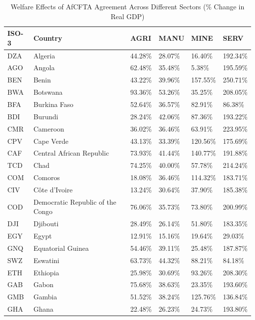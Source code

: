 \begin{table}[htbp]
\centering
\caption{Welfare Effects of AfCFTA Agreement Across Different Sectors (\% Change in Real GDP)} 
\label{table_3}
\begingroup\small
\begin{tabular}{llllll}
  \hline
ISO-3 & Country & AGRI & MANU & MINE & SERV \\ 
  \hline
DZA & Algeria & 44.28\% & 28.07\% & 16.40\% & 192.34\% \\ 
  AGO & Angola & 62.48\% & 35.48\% & 5.38\% & 195.59\% \\ 
  BEN & Benin & 43.22\% & 39.96\% & 157.55\% & 250.71\% \\ 
  BWA & Botswana & 93.36\% & 53.26\% & 35.25\% & 208.05\% \\ 
  BFA & Burkina Faso & 52.64\% & 36.57\% & 82.91\% & 86.38\% \\ 
  BDI & Burundi & 28.24\% & 42.06\% & 87.36\% & 193.22\% \\ 
  CMR & Cameroon & 36.02\% & 36.46\% & 63.91\% & 223.95\% \\ 
  CPV & Cape Verde & 43.13\% & 33.39\% & 120.56\% & 175.69\% \\ 
  CAF & Central African Republic & 73.93\% & 41.44\% & 140.77\% & 191.88\% \\ 
  TCD & Chad & 74.25\% & 40.00\% & 57.78\% & 214.24\% \\ 
  COM & Comoros & 18.08\% & 36.46\% & 114.32\% & 183.71\% \\ 
  CIV & Côte d’Ivoire & 13.24\% & 30.64\% & 37.90\% & 185.38\% \\ 
  COD & Democratic Republic of the Congo & 76.06\% & 35.73\% & 73.80\% & 200.99\% \\ 
  DJI & Djibouti & 28.49\% & 26.14\% & 51.80\% & 183.35\% \\ 
  EGY & Egypt & 12.91\% & 15.16\% & 19.64\% & 29.03\% \\ 
  GNQ & Equatorial Guinea & 54.46\% & 39.11\% & 25.48\% & 187.87\% \\ 
  SWZ & Eswatini & 63.73\% & 44.32\% & 88.21\% & 84.18\% \\ 
  ETH & Ethiopia & 25.98\% & 30.69\% & 93.26\% & 208.30\% \\ 
  GAB & Gabon & 75.68\% & 38.63\% & 23.35\% & 193.60\% \\ 
  GMB & Gambia & 51.52\% & 38.24\% & 125.76\% & 136.84\% \\ 
  GHA & Ghana & 22.48\% & 26.23\% & 24.73\% & 193.80\% \\ 

\end{tabular}
\end{table}
